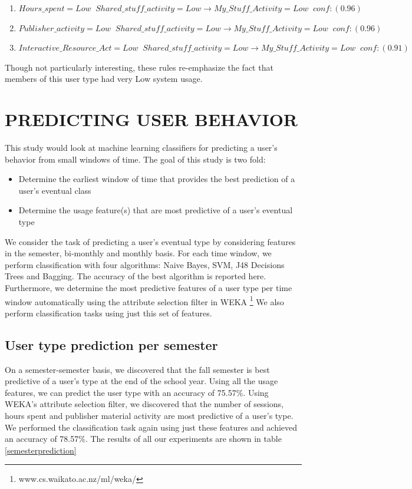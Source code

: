 \documentclass{acm_proc_article-sp}
\begin{document}
\begin{enumerate}

\item $Hours\_spent=Low \;\; Shared\_stuff\_activity =Low  \longrightarrow My\_Stuff\_Activity =Low  \;\;    conf:(0.96)$
\item $Publisher\_activity=Low \;\; Shared\_stuff\_activity=Low  \longrightarrow My\_Stuff\_Activity = Low  \;\;  conf:(0.96)$
\item $Interactive\_Resource\_Act=Low  \;\;Shared\_stuff\_activity=Low  \longrightarrow My\_Stuff\_Activity=Low  \;\; conf:(0.91)$
\end{enumerate}
Though not particularly interesting, these rules re-emphasize the fact that members of this user type had very Low system usage.

 \section {PREDICTING USER BEHAVIOR}
This study would look at machine learning classifiers for predicting a user's behavior from small windows of time. The goal of this study is two fold:
\begin{itemize}
\item Determine the earliest window of time that provides the best prediction of a user's eventual class
\item Determine the usage feature(s) that are most predictive of a user's eventual type
\end{itemize}

We consider the task of predicting a user's eventual type by considering features in the semester, bi-monthly and monthly basis.
For each time window, we perform  classification with four algorithms: Naive Bayes, SVM, J48 Decisions Trees and Bagging. The accuracy of the best algorithm is reported here. Furthermore, we determine the most predictive features of a user type per time window automatically using the attribute selection filter in WEKA \footnote{www.cs.waikato.ac.nz/ml/weka/} We also perform classification tasks using just this set of features.
\subsection{User type prediction per semester}
On a semester-semester basis, we discovered that the fall semester is best predictive of a user's type at the end of the school year. Using all the usage features, we can predict the user type with an accuracy of 75.57\%. Using WEKA's attribute selection filter, we discovered that the number of sessions, hours spent and publisher material activity are most predictive of a user's type. We performed the classification task again using just these features and achieved an accuracy of 78.57\%. The results of all our experiments are shown in table \ref{semesterprediction}
\end{document}
